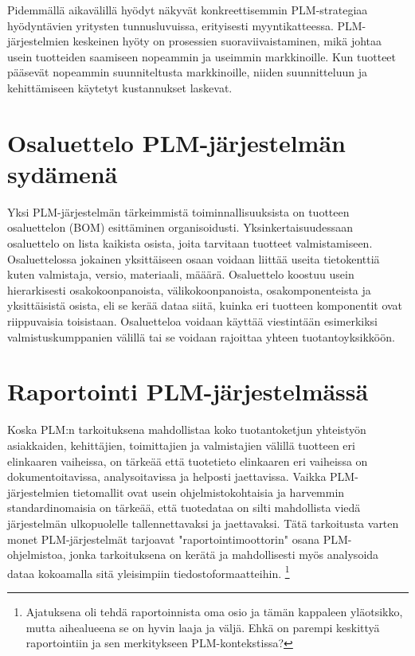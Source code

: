 Pidemmällä aikavälillä hyödyt näkyvät konkreettisemmin PLM-strategiaa hyödyntävien yritysten tunnusluvuissa, erityisesti myyntikatteessa. PLM-järjestelmien keskeinen hyöty on prosessien suoraviivaistaminen, mikä johtaa usein tuotteiden saamiseen nopeammin ja useimmin markkinoille. Kun tuotteet pääsevät nopeammin suunniteltusta markkinoille, niiden suunnitteluun ja kehittämiseen käytetyt kustannukset laskevat. \cite{bouhaddou_plm_2012} \cite{alemanni_key_2008}


\section{Osaluettelo PLM-järjestelmän sydämenä} \label{Osaluettelo PLM-järjestelmän sydämenä}

Yksi PLM-järjestelmän tärkeimmistä toiminnallisuuksista on tuotteen osaluettelon (BOM) esittäminen organisoidusti. \cite{david_what_2016} Yksinkertaisuudessaan osaluettelo on lista kaikista osista, joita tarvitaan tuotteet valmistamiseen. Osaluettelossa jokainen yksittäiseen osaan voidaan liittää useita tietokenttiä kuten valmistaja, versio, materiaali, määärä. Osaluettelo koostuu usein hierarkisesti osakokoonpanoista, välikokoonpanoista, osakomponenteista ja yksittäisistä osista, eli se kerää dataa siitä, kuinka eri tuotteen komponentit ovat riippuvaisia toisistaan. Osaluetteloa voidaan käyttää viestintään esimerkiksi valmistuskumppanien välillä tai se voidaan rajoittaa yhteen tuotantoyksikköön.  \cite{jones_visualizing_2023}


\section{Raportointi PLM-järjestelmässä} \label{Raportointi PLM-järjestelmässä}

Koska PLM:n tarkoituksena mahdollistaa koko tuotantoketjun yhteistyön asiakkaiden, kehittäjien, toimittajien ja valmistajien välillä tuotteen eri elinkaaren vaiheissa, \cite{bouhaddou_plm_2012} on tärkeää että tuotetieto elinkaaren eri vaiheissa on dokumentoitavissa, analysoitavissa ja helposti jaettavissa. Vaikka PLM-järjestelmien tietomallit ovat usein ohjelmistokohtaisia ja harvemmin standardinomaisia \cite{SritiMohamed-Foued2012PTaS} on tärkeää, että tuotedataa on silti mahdollista viedä järjestelmän ulkopuolelle tallennettavaksi ja jaettavaksi. Tätä tarkoitusta varten monet PLM-järjestelmät tarjoavat "raportointimoottorin" osana PLM-ohjelmistoa, jonka tarkoituksena on kerätä ja mahdollisesti myös analysoida dataa kokoamalla sitä yleisimpiin tiedostoformaatteihin. \footnote{Ajatuksena oli tehdä raportoinnista oma osio ja tämän kappaleen yläotsikko, mutta aihealueena se on hyvin laaja ja väljä. Ehkä on parempi keskittyä raportointiin ja sen merkitykseen PLM-kontekstissa?}

